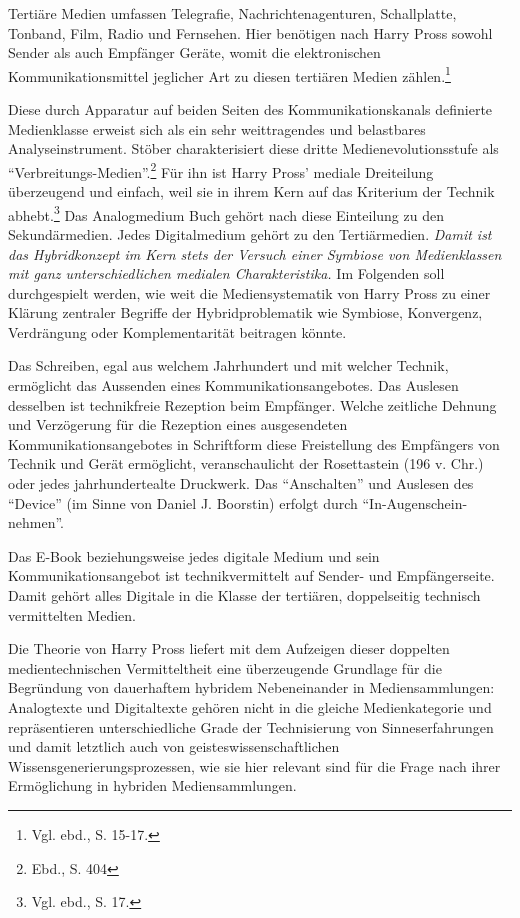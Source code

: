 \documentclass[a4paper,
fontsize=11pt,
oneside,
numbers=noperiodatend,
parskip=half-,
bibliography=totoc,
final
]{scrartcl}
\begin{document}
Tertiäre Medien umfassen Telegrafie, Nachrichtenagenturen, Schallplatte,
Tonband, Film, Radio und Fernsehen. Hier benötigen nach Harry Pross
sowohl Sender als auch Empfänger Geräte, womit die elektronischen
Kommunikationsmittel jeglicher Art zu diesen tertiären Medien
zählen.\footnote{Vgl. ebd., S. 15-17.}

Diese durch Apparatur auf beiden Seiten des Kommunikationskanals
definierte Medienklasse erweist sich als ein sehr weittragendes und
belastbares Analyseinstrument. Stöber charakterisiert diese dritte
Medienevolutionsstufe als \enquote{Verbreitungs-Medien}.\footnote{Ebd.,
  S. 404} Für ihn ist Harry Pross' mediale Dreiteilung überzeugend und
einfach, weil sie in ihrem Kern auf das Kriterium der Technik
abhebt.\footnote{Vgl. ebd., S. 17.} Das Analogmedium Buch gehört nach
diese Einteilung zu den Sekundärmedien. Jedes Digitalmedium gehört zu
den Tertiärmedien. \emph{Damit ist das Hybridkonzept im Kern stets der
Versuch einer Symbiose von Medienklassen mit ganz unterschiedlichen
medialen Charakteristika.} Im Folgenden soll durchgespielt werden, wie
weit die Mediensystematik von Harry Pross zu einer Klärung zentraler
Begriffe der Hybridproblematik wie Symbiose, Konvergenz, Verdrängung
oder Komplementarität beitragen könnte.

Das Schreiben, egal aus welchem Jahrhundert und mit welcher Technik,
ermöglicht das Aussenden eines Kommunikationsangebotes. Das Auslesen
desselben ist technikfreie Rezeption beim Empfänger. Welche zeitliche
Dehnung und Verzögerung für die Rezeption eines ausgesendeten
Kommunikationsangebotes in Schriftform diese Freistellung des Empfängers
von Technik und Gerät ermöglicht, veranschaulicht der Rosettastein (196
v. Chr.) oder jedes jahrhundertealte Druckwerk. Das \enquote{Anschalten}
und Auslesen des \enquote{Device} (im Sinne von Daniel J. Boorstin)
erfolgt durch \enquote{In-Augenschein-nehmen}.

Das E-Book beziehungsweise jedes digitale Medium und sein
Kommunikationsangebot ist technikvermittelt auf Sender- und
Empfängerseite. Damit gehört alles Digitale in die Klasse der tertiären,
doppelseitig technisch vermittelten Medien.

Die Theorie von Harry Pross liefert mit dem Aufzeigen dieser doppelten
medientechnischen Vermitteltheit eine überzeugende Grundlage für die
Begründung von dauerhaftem hybridem Nebeneinander in Mediensammlungen:
Analogtexte und Digitaltexte gehören nicht in die gleiche
Medienkategorie und repräsentieren unterschiedliche Grade der
Technisierung von Sinneserfahrungen und damit letztlich auch von
geisteswissenschaftlichen Wissensgenerierungsprozessen, wie sie hier
relevant sind für die Frage nach ihrer Ermöglichung in hybriden
Mediensammlungen.
\end{document}
